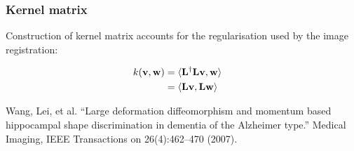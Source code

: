 \begin{frame}
\frametitle{Kernel matrix}
Construction of kernel matrix accounts for the regularisation used by the image registration:
\begin{Large}
\begin{align*}
k({\bf v},{\bf w}) & = \langle {\bf L}^{\dagger} {\bf L} {\bf v}, {\bf w} \rangle\cr
                   & = \langle {\bf L} {\bf v}, {\bf L} {\bf w} \rangle
\end{align*}
\end{Large}

\vspace{0.25cm}
\begin{tiny}
Wang, Lei, et al. ``Large deformation diffeomorphism and momentum based hippocampal shape discrimination in dementia of the Alzheimer type.'' Medical Imaging, IEEE Transactions on 26(4):462--470 (2007).\par
\end{tiny}
\end{frame}




